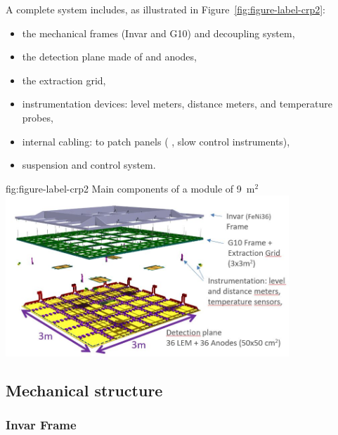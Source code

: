 A complete  system includes, as illustrated in Figure~\ref{fig:figure-label-crp2}:
\begin{itemize}
\item the mechanical frames (Invar and G10) and decoupling system,
\item the detection plane made of  and anodes,
\item the extraction grid,
\item instrumentation devices: level meters, distance meters, and temperature probes,
\item internal cabling: to patch panels ( , slow control instruments),
\item suspension and control system.
\end{itemize}

\begin{dunefigure}{fig:figure-label-crp2}
{Main components of a  module of  \SI{9}{m$^{2}$}}
\includegraphics[width=0.8\textwidth]{graphics/CRP-design-components}
\end{dunefigure}

\subsection{Mechanical structure}
\label{sec:fddp-crp-mechanics}
\subsubsection{Invar Frame}

